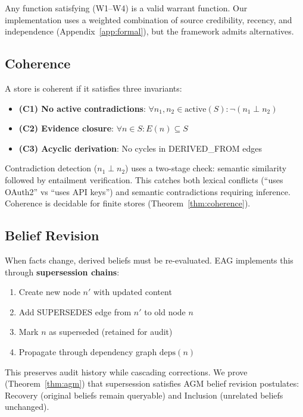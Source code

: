 \documentclass[11pt,a4paper]{article}
\begin{document}
Any function satisfying (W1--W4) is a valid warrant function. Our implementation uses a weighted combination of source credibility, recency, and independence (Appendix~\ref{app:formal}), but the framework admits alternatives.

\subsection{Coherence}

A store is coherent if it satisfies three invariants:

\begin{itemize}[noitemsep]
    \item \textbf{(C1) No active contradictions}: $\forall n_1, n_2 \in \text{active}(S): \neg(n_1 \perp n_2)$
    \item \textbf{(C2) Evidence closure}: $\forall n \in S: E(n) \subseteq S$
    \item \textbf{(C3) Acyclic derivation}: No cycles in DERIVED\_FROM edges
\end{itemize}

Contradiction detection ($n_1 \perp n_2$) uses a two-stage check: semantic similarity followed by entailment verification. This catches both lexical conflicts (``uses OAuth2'' vs ``uses API keys'') and semantic contradictions requiring inference. Coherence is decidable for finite stores (Theorem~\ref{thm:coherence}).

\subsection{Belief Revision}

When facts change, derived beliefs must be re-evaluated. EAG implements this through \textbf{supersession chains}:

\begin{enumerate}[noitemsep]
    \item Create new node $n'$ with updated content
    \item Add SUPERSEDES edge from $n'$ to old node $n$
    \item Mark $n$ as superseded (retained for audit)
    \item Propagate through dependency graph $\text{deps}(n)$
\end{enumerate}

This preserves audit history while cascading corrections. We prove (Theorem~\ref{thm:agm}) that supersession satisfies AGM belief revision postulates: Recovery (original beliefs remain queryable) and Inclusion (unrelated beliefs unchanged).
\end{document}

